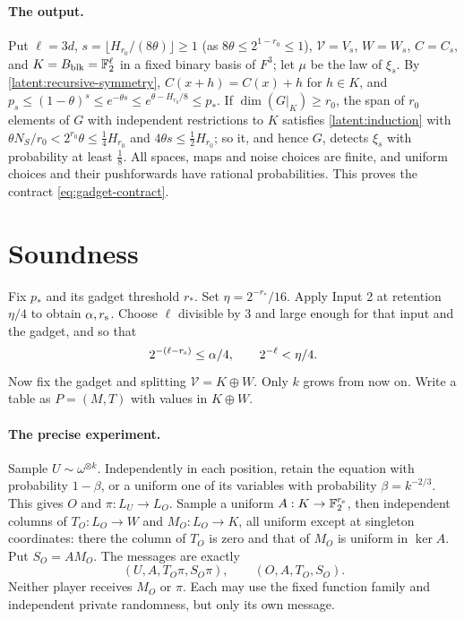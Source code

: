 \documentclass[11pt]{article}
\newcommand{\F}{\mathbb F}
\begin{document}
\paragraph{The output.} Put $\ell=3d$, $s=\lfloor
H_{r_0}/(8\theta)\rfloor\ge1$ (as $8\theta\le2^{1-r_0}\le1$), $\mathcal
V=V_s$, $W=W_s$, $C=C_s$, and $K=B_{\rm blk}=\F_2^\ell$ in a fixed binary
basis of $F^3$; let $\mu$ be the law of $\xi_s$. By
\eqref{latent:recursive-symmetry}, $C(x+h)=C(x)+h$ for $h\in K$, and
$p_s\le(1-\theta)^s\le e^{-\theta s}\le e^{\theta-H_{r_0}/8}\le p_*$. If
$\dim(G|_K)\ge r_0$, the span of $r_0$ elements of $G$ with independent
restrictions to $K$ satisfies \eqref{latent:induction} with $\theta
N_S/r_0<2^{r_0}\theta\le\frac14H_{r_0}$ and $4\theta s\le\frac12H_{r_0}$;
so it, and hence $G$, detects $\xi_s$ with probability at least $\frac18$.
All spaces, maps and noise choices are finite, and uniform choices and
their pushforwards have rational probabilities. This proves the contract
\eqref{eq:gadget-contract}.


\section{Soundness}\label{sec:decoders}

Fix $p_*$ and its gadget threshold $r_*$. Set $\eta=2^{-r_*}/16$.
Apply Input 2 at retention $\eta/4$ to obtain $\alpha,r_{\rm s}$. Choose
$\ell$ divisible by $3$ and large enough for that input and the gadget, and so that
\begin{equation}\label{eq:matrix-parameters}
 2^{-(\ell-r_{\rm s})}\le\alpha/4,\qquad 2^{-\ell}<\eta/4.
\end{equation}
Now fix the gadget and splitting $\mathcal V=K\oplus W$. Only $k$ grows
from now on. Write a table as $P=(M,T)$ with values in $K\oplus W$.

\paragraph{The precise experiment.}
Sample $U\sim\omega^{\otimes k}$. Independently in each position, retain
the equation with probability $1-\beta$, or a uniform one of its variables
with probability $\beta=k^{-2/3}$. This gives $O$ and $\pi:L_U\to L_O$.
Sample a uniform $A:K\to\F_2^{r_{\rm s}}$, then independent columns of
$T_O:L_O\to W$ and $M_O:L_O\to K$, all uniform except at singleton
coordinates: there the column of $T_O$ is zero and that of $M_O$ is
uniform in $\ker A$. Put $S_O=AM_O$. The messages are exactly
\begin{equation}\label{eq:messages}
 (U,A,T_O\pi,S_O\pi),\qquad (O,A,T_O,S_O).
\end{equation}
Neither player receives $M_O$ or $\pi$. Each may use the fixed function
family and independent private randomness, but only its own message.
\end{document}
